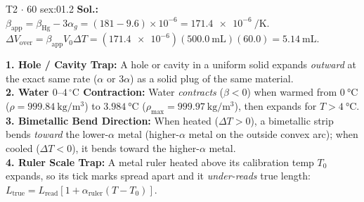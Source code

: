 \begin{quicksheet}
\begin{twocol}[0.52]
\begin{workedexample}{T2 $\cdot$ 60 s}{ex:01.2}
\textbf{Sol.:} $\beta_{\mathrm{app}} = \beta_{\mathrm{Hg}} - 3\alpha_g = (181 - 9.6)\times 10^{-6} = \SI{171.4e-6}{\per\kelvin}$.
$\Delta V_{\mathrm{over}} = \beta_{\mathrm{app}} V_0 \Delta T = (\num{171.4e-6})(\SI{500.0}{\milli\liter})(60.0) = \SI{5.14}{\milli\liter}$.
\end{workedexample}
\begin{trapbox}
\footnotesize
\textbf{1. Hole / Cavity Trap:} A hole or cavity in a uniform solid expands \emph{outward} at the exact same rate ($\alpha$ or $3\alpha$) as a solid plug of the same material.\\
\textbf{2. Water $0\text{--}4\,^\circ\mathrm{C}$ Contraction:} Water \emph{contracts} ($\beta < 0$) when warmed from $\SI{0}{\celsius}$ ($\rho = \SI{999.84}{\kilogram\per\cubic\meter}$) to $\SI{3.984}{\celsius}$ ($\rho_{\max} = \SI{999.97}{\kilogram\per\cubic\meter}$), then expands for $T > \SI{4}{\celsius}$.\\
\textbf{3. Bimetallic Bend Direction:} When heated ($\Delta T > 0$), a bimetallic strip bends \emph{toward} the lower-$\alpha$ metal (higher-$\alpha$ metal on the outside convex arc); when cooled ($\Delta T < 0$), it bends toward the higher-$\alpha$ metal.\\
\textbf{4. Ruler Scale Trap:} A metal ruler heated above its calibration temp $T_0$ expands, so its tick marks spread apart and it \emph{under-reads} true length: $L_{\mathrm{true}} = L_{\mathrm{read}}[1 + \alpha_{\mathrm{ruler}}(T - T_0)]$.
\end{trapbox}
\end{twocol}
\end{quicksheet}

